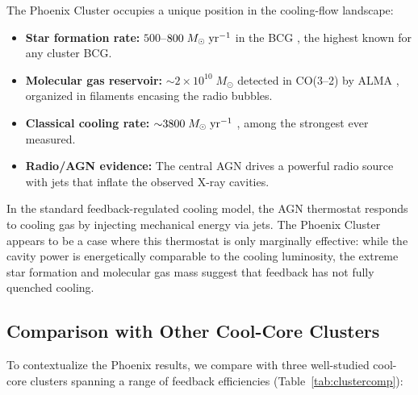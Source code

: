 \documentclass[twocolumn]{aastex63}
\newcommand{\Msun}{M_{\odot}}
\newcommand{\yr}{\rm yr}
\begin{document}
The Phoenix Cluster occupies a unique position in the cooling-flow landscape:

\begin{itemize}
  \item \textbf{Star formation rate:} $500$--$800\;\Msun\;\yr^{-1}$ in the BCG
    \citep{McDonald2012, McDonald2015}, the highest known for any cluster BCG.
  \item \textbf{Molecular gas reservoir:} ${\sim}2 \times 10^{10}\;\Msun$
    detected in CO(3--2) by ALMA \citep{Russell2017}, organized in filaments
    encasing the radio bubbles.
  \item \textbf{Classical cooling rate:} ${\sim}3800\;\Msun\;\yr^{-1}$
    \citep{McDonald2012}, among the strongest ever measured.
  \item \textbf{Radio/AGN evidence:} The central AGN drives a powerful radio
    source with jets that inflate the observed X-ray cavities.
\end{itemize}

In the standard feedback-regulated cooling model, the AGN thermostat responds to
cooling gas by injecting mechanical energy via jets. The Phoenix Cluster appears
to be a case where this thermostat is only marginally effective: while the cavity
power is energetically comparable to the cooling luminosity, the extreme star
formation and molecular gas mass suggest that feedback has not fully quenched
cooling.

\subsection{Comparison with Other Cool-Core Clusters}
\label{sec:clustercomp}

To contextualize the Phoenix results, we compare with three well-studied
cool-core clusters spanning a range of feedback efficiencies
(Table~\ref{tab:clustercomp}):
\end{document}
